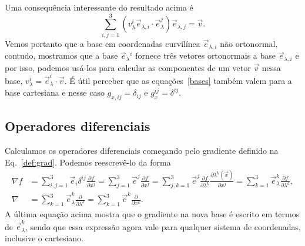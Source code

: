 Uma consequência interessante do resultado acima é
\begin{equation}\label{ident}
	\sum_{i,j=1}^3\left(v_\lambda^i\vec{e}_{\lambda,i}\cdot\vec{e}_{\lambda}^j\right)\vec{e}_{\lambda,j} = \vec{v}.
\end{equation}
Vemos portanto que a base em coordenadas curvilínea $\vec{e}_{\lambda,i}$ não
ortonormal, contudo, mostramos que a base $\vec{e}_{\lambda}{}^{i}$ fornece três
vetores ortonormais a base $\vec{e}_{\lambda,i}$ e por isso, podemos usá-los
para calcular as componentes de um vetor $\vec{v}$ nessa base, $ v_\lambda^i =
	\vec{e}_\lambda^i\cdot\vec{v} $. É útil perceber que as equações~\eqref{bases}
também valem para a base cartesiana e nesse caso $g_{x,ij} = \delta_{ij}$ e
$g_x^{ij} = \delta^{ij}$.

\subsection{Operadores diferenciais}

Calculamos os operadores diferenciais começando pelo gradiente definido na
Eq.~\eqref{def:grad}. Podemos reescrevê-lo da forma
\begin{align}
	\label{gradf}\nabla f & = \sum_{i,j=1}^3\vec{e}_i\delta^{ij}\frac{\partial f}{\partial x^j} = \sum_{j=1}^3\vec{e}^j\frac{\partial f}{\partial x^j} = \sum_{j,k=1}^3\vec{e}^j\frac{\partial f}{\partial \lambda^k}\frac{\partial\lambda^k(\vec{x})}{\partial x^j} = \sum_{k=1}^3\vec{e}_\lambda^k\frac{\partial f}{\partial \lambda^k}, \\
	\label{grad}\nabla    & = \sum_{k=1}^3\vec{e}_\lambda^k\frac{\partial }{\partial \lambda^k} = \sum_{k=1}^3\vec{e}^k\frac{\partial }{\partial x^k}.
\end{align}
A última equação acima mostra que o gradiente na nova base é escrito em termos
de $\vec{e}_\lambda^k$, sendo que essa expressão agora vale para qualquer
sistema de coordenadas, inclusive o cartesiano.

